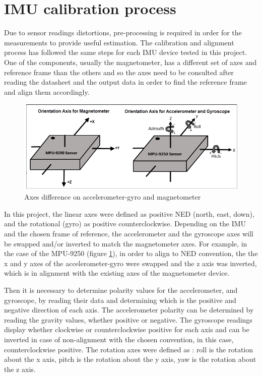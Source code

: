 \section{IMU calibration process}

Due to sensor readings distortions, pre-processing is required in order for the measurements to provide useful estimation. The calibration and alignment process has followed the same steps for each IMU device tested in this project. One of the components, usually the magnetometer, has a different set of axes and reference frame than the others and so the axes need to be consulted after reading the datasheet and the output data in order to find the reference frame and align them accordingly. 
 
\begin{figure}[h!]
  \centering
  \includegraphics[scale=0.8]{graphics/mpu9250.png}
  \caption{Axes difference on accelerometer-gyro and magnetometer}
  \label{fig:mpu}
\end{figure} 
 

In this project, the linear axes were defined as positive NED (north, east, down), and the rotational (gyro) as positive counterclockwise. Depending on the IMU and the chosen frame of reference, the accelerometer and the gyroscope axes will be swapped and/or inverted to match the magnetometer axes. For example, in the case of the MPU-9250 (figure \ref{fig:mpu}), in order to align to NED convention, the the x and y axes of the accelerometer-gyro were swapped and the z axis was inverted, which is in alignment with the existing axes of the magnetometer device. 


Then it is necessary to determine polarity values for the accelerometer, and gyroscope, by reading their data and determining which is the positive and negative direction of each axis. The accelerometer polarity can be determined by reading the gravity values, whether positive or negative. The gyroscope readings display whether clockwise or counterclockwise positive for each axis and can be inverted in case of non-alignment with the chosen convention, in this case, counterclockwise positive. The rotation axes were defined as \cite{de2012spacecraft}: roll is the rotation about the x axis, pitch is the rotation about the y axis, yaw is the rotation about the z axis. 

